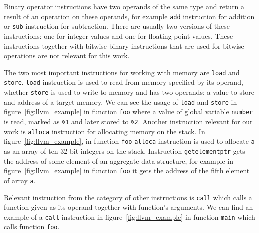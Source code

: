 Binary operator instructions have two operands of the same type and return a
result of an operation on these operands, for example \texttt{add} instruction
for addition or \texttt{sub} instruction for subtraction. There are usually two
versions of these instructions: one for integer values and one for floating
point values. These instructions together with bitwise binary instructions
that are used for bitwise operations are not relevant for this work.

The two most important instructions for working with memory are \texttt{load}
and \texttt{store}. \texttt{load} instruction is used to read from memory
specified by its operand, whether \texttt{store} is used to write to memory and
has two operands: a value to store and address of a target memory. We can see
the usage of \texttt{load} and \texttt{store} in figure~\ref{fig:llvm_example}
in function \texttt{foo} where a value of global variable \texttt{number} is
read, marked as \texttt{\%1} and later stored to \texttt{\%2}. Another
instruction relevant for our work is \texttt{alloca} instruction for allocating
memory on the stack. In figure~\ref{fig:llvm_example}, in function \texttt{foo}
\texttt{alloca} instruction is used to allocate \texttt{a} as an array of ten
32-bit integers on the stack. Instruction \texttt{getelementptr} gets the
address of some element of an aggregate data structure, for example in
figure~\ref{fig:llvm_example} in function \texttt{foo} it gets the address of
the fifth element of array \texttt{a}.

Relevant instruction from the category of other instructions is \texttt{call}
which calls a function given as its operand together with function's arguments.
We can find an example of a \texttt{call} instruction in
figure~\ref{fig:llvm_example} in function \texttt{main} which calls function
\texttt{foo}.
